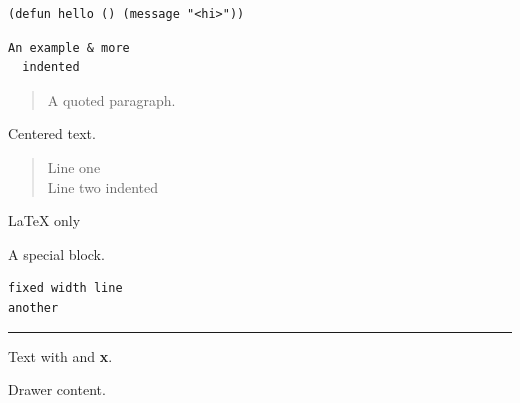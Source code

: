\begin{verbatim}
(defun hello () (message "<hi>"))
\end{verbatim}

\begin{verbatim}
An example & more
  indented
\end{verbatim}

\begin{quote}
A quoted paragraph.
\end{quote}

\begin{center}
Centered text.
\end{center}

\begin{verse}
Line one\\
\hspace*{3\fontdimen2\font}Line two indented\\
\end{verse}

\LaTeX{} only

\begin{note}
A special block.
\end{note}

\begin{verbatim}
fixed width line
another
\end{verbatim}


\noindent\rule{\textwidth}{0.5pt}

Text with and \textbf{x}.

Drawer content.
